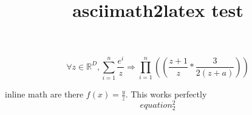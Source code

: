 \documentclass{article}
\begin{document}
\title{asciimath2latex test}

\maketitle
\begin{equation}
 \forall z \in \mathbb{R}^D, \sum_{i=1}^n\frac{e^i}{z}\Rightarrow \prod_{i=1}^n\left(\left(\frac{z+1}{z}*\frac{3}{2\left(z+a\right)}\right)\right) 
 \end{equation}



inline math are there $f\left(x\right)=\frac{y}{z}$. This works perfectly
\begin{equation}
 equation_2^2 
 \end{equation}
\end{document}
